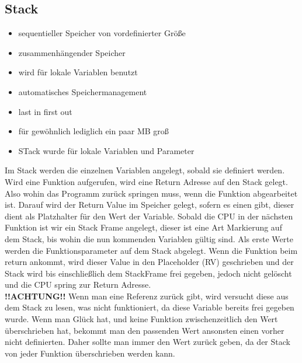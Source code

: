 \subsection{Stack}
\begin{itemize}
	\item sequentieller Speicher von vordefinierter Größe
	\item zusammenhängender Speicher
	\item wird für lokale Variablen benutzt
	\item automatisches Speichermanagement
	\item last in first out
	\item für gewöhnlich lediglich ein paar MB groß
	\item STack wurde für lokale Variablen und Parameter 
\end{itemize}
Im Stack werden die einzelnen Variablen angelegt, sobald sie definiert werden.  Wird eine Funktion aufgerufen, wird eine Return Adresse auf den Stack gelegt. Also wohin das Programm  zurück springen muss, wenn die Funktion abgearbeitet ist. Darauf wird der Return Value im Speicher gelegt, sofern es einen gibt, dieser dient als Platzhalter für den Wert der Variable. Sobald die CPU in der nächsten Funktion ist wir ein Stack Frame angelegt, dieser ist eine Art Markierung auf dem Stack, bis wohin die nun kommenden Variablen gültig sind. Als erste Werte werden die Funktionsparameter auf dem Stack abgelegt. Wenn die Funktion beim return ankommt, wird dieser Value in den Placeholder (RV) geschrieben und der Stack wird bis einschließlich dem StackFrame frei gegeben, jedoch nicht gelöscht und die CPU spring zur Return Adresse. \\
\textbf{!!ACHTUNG!!} Wenn man eine Referenz zurück gibt, wird versucht diese aus dem Stack zu lesen, was nicht funktioniert, da diese Variable bereits frei gegeben wurde. Wenn man Glück hat, und keine Funktion zwischenzeitlich den Wert überschrieben hat, bekommt man den passenden Wert ansonsten einen vorher nicht definierten. Daher sollte man immer den Wert zurück geben, da der Stack von jeder Funktion überschrieben werden kann.  
